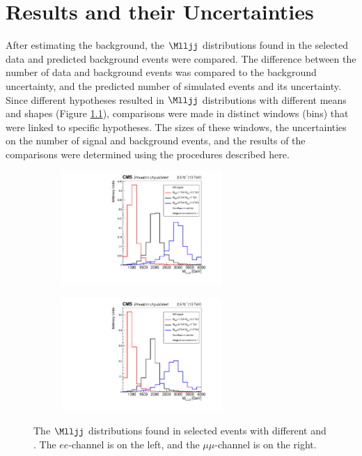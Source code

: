 \chapter{Results and their Uncertainties}
\label{statAnalysis_uncerts_results}
After estimating the background, the $\Mlljj$ distributions found in the selected data and predicted background events 
were compared.  The difference between the number of data and background events was compared to the background uncertainty, 
and the predicted number of simulated \WR events and its uncertainty.  Since different \mWR hypotheses resulted in $\Mlljj$ 
distributions with different means and shapes (Figure \ref{fig:signalShapes}), comparisons were made in distinct windows (bins) 
that were linked to specific \mWR hypotheses.  The sizes of these windows, the uncertainties on the number of signal and background 
events, and the results of the comparisons were determined using the procedures described here.

\begin{figure}
	\centering
	\begin{subfigure}[t]{2.4in}
		\centering
		\includegraphics[width=2.4in]{figures/Mlljj_signalRegionCuts_severalWrSignals_EE.pdf}
	\end{subfigure}
	\thickspace
	\begin{subfigure}[t]{2.4in}
		\centering
		\includegraphics[width=2.4in]{figures/Mlljj_signalRegionCuts_severalWrSignals_MuMu.pdf}
	\end{subfigure}
	\caption{The $\Mlljj$ distributions found in selected \WR events with different \mWR and \mnul.  The $ee$-channel is on the 
	left, and the $\mu\mu$-channel is on the right.}
	\label{fig:signalShapes}
\end{figure}


